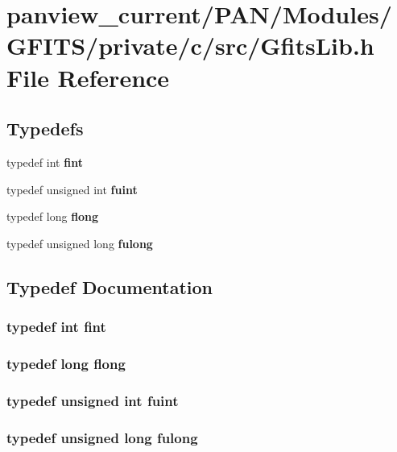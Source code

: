 \section{panview\_\-current/PAN/Modules/GFITS/private/c/src/Gfits\-Lib.h File Reference}
\label{GfitsLib_8h}
\subsection*{Typedefs}
\begin{CompactItemize}
\item 
typedef int \bf{fint}
\item 
typedef unsigned int \bf{fuint}
\item 
typedef long \bf{flong}
\item 
typedef unsigned long \bf{fulong}
\end{CompactItemize}


\subsection{Typedef Documentation}
\subsubsection{\setlength{\rightskip}{0pt plus 5cm}typedef int \bf{fint}}\label{GfitsLib_8h_bbadc35b786b60c71fe7e77fa565acf4}


\subsubsection{\setlength{\rightskip}{0pt plus 5cm}typedef long \bf{flong}}\label{GfitsLib_8h_e1df586035cfd1da4cc653afedd5b7b5}


\subsubsection{\setlength{\rightskip}{0pt plus 5cm}typedef unsigned int \bf{fuint}}\label{GfitsLib_8h_70a92f5bb9c8c86565e2172682e87bfa}


\subsubsection{\setlength{\rightskip}{0pt plus 5cm}typedef unsigned long \bf{fulong}}\label{GfitsLib_8h_b306c6ee31a82e41e1a4b05bbce27109}


